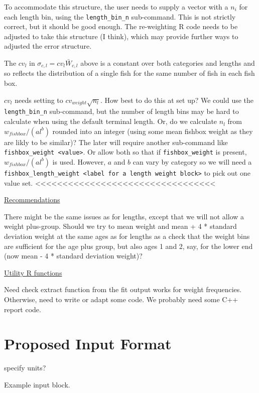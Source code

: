 \documentclass[a4paper,11pt,twoside,pdftex,draft]{article}
\begin{document}
To accommodate this structure, the user needs to supply a vector with a $n_i$ for each length bin, using the \texttt{length\_bin\_n} sub-command. This is not strictly correct, but it should be good enough. The re-weighting R code needs to be adjusted to take this structure (I think), which may provide further ways to adjusted the error structure.

The $cv_{l}$ in $\sigma_{c,l}= cv_{l} \bar W_{c,l}$ above is a constant over both categories and lengths and so reflects the distribution of a single fish for the same number of fish in each fish box.
 
$cv_{l}$ needs setting to $ cv_{weight} \sqrt{n_{l}}$. How 
best to do this at set up? We could use the \texttt{length\_bin\_n} sub-command, but the number of length bins may be hard to calculate when using the default terminal length. Or, do we  calculate $n_{l}$ from 
$ w_{fish box}/ (a l^{b}) $ rounded into an integer (using some mean fishbox weight as they are likly to be similar)? The later will require another sub-command like \texttt{fishbox\_weight <value>}. Or allow both so that if \texttt{fishbox\_weight} is present, $ w_{fish box}/ (a l^{b}) $ is used. However, $a$ and $b$ can vary by category so we will need a \texttt{fishbox\_length\_weight <label for a length weight block>} to pick out one value set. <<<<<<<<<<<<<<<<<<<<<<<<<<<<<<<<<

\bigskip
\underline{Recommendations}

There might be the same issues as for lengths, except that we will not allow a weight plus-group. Should we try to mean weight and mean + 4 * standard deviation weight at the same ages as for lengths as a check that the weight bins are sufficient for the age plus group, but also ages 1 and 2, say, for the lower end (now mean - 4 * standard deviation weight)?

\bigskip
\underline{Utility R functions}

Need check extract function from the fit output works for weight frequencies. Otherwise, need to write or adapt some code. 
We probably need some C++ report code. 

\section{Proposed Input Format}

specify units?

Example input block.
\end{document}
